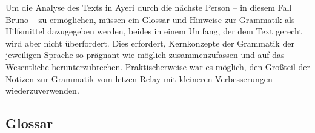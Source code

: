\documentclass[
	12pt,
	ngerman,
]{scrartcl}
\newcommand{\zwsp}{\mbox{​}} %
\newcommand{\ayr}[1]{\zwsp\smash{{\Tagati #1}}} %
\begin{document}
Um die Analyse des Texts in Ayeri durch die nächste Person -- in diesem Fall
Bruno -- zu ermöglichen, müssen ein Glossar und Hinweise zur Grammatik als
Hilfsmittel dazugegeben werden, beides in einem Umfang, der dem Text gerecht
wird aber nicht überfordert. Dies erfordert, Kernkonzepte der Grammatik der
jeweiligen Sprache so prägnant wie möglich zusammenzufassen und auf das
Wesentliche herunterzubrechen. Praktischerweise war es möglich, den Großteil
der Notizen zur Grammatik vom letzen Relay mit kleineren Verbesserungen
wiederzuverwenden.

\subsection{Glossar}

\begin{multicols}{2}
\raggedright
\begin{description}[nosep]


\end{description}
\end{multicols}
\end{document}
